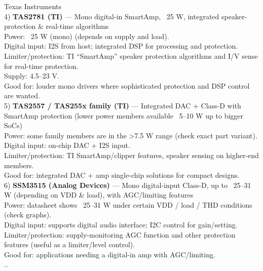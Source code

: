 {	Texas Instruments\\4) \textbf{TAS2781 (TI)} — Mono digital-in SmartAmp, ~25 W, integrated speaker-protection \& real-time algorithms\\Power: ~25 W (mono) (depends on supply and load).\\Digital input: I2S from host; integrated DSP for processing and protection.\\Limiter/protection: TI “SmartAmp” speaker protection algorithms and I/V sense for real-time protection.\\Supply: 4.5–23 V.\\Good for: louder mono drivers where sophisticated protection and DSP control are wanted.\\5) \textbf{TAS2557 / TAS255x family (TI)} — Integrated DAC + Class-D with SmartAmp protection (lower power members available ~5–10 W up to bigger SoCs)\\Power: some family members are in the >7.5 W range (check exact part variant).\\Digital input: on-chip DAC + I2S input.\\Limiter/protection: TI SmartAmp/clipper features, speaker sensing on higher-end members.\\Good for: integrated DAC + amp single-chip solutions for compact designs.\\6) \textbf{SSM3515 (Analog Devices)} — Mono digital-input Class-D, up to ~25–31 W (depending on VDD \& load), with AGC/limiting features\\Power: datasheet shows ~25–31 W under certain VDD / load / THD conditions (check graphs).\\Digital input: supports digital audio interface; I2C control for gain/setting.\\Limiter/protection: supply-monitoring AGC function and other protection features (useful as a limiter/level control).\\Good for: applications needing a digital-in amp with AGC/limiting.}\\.\dotfill.\\
